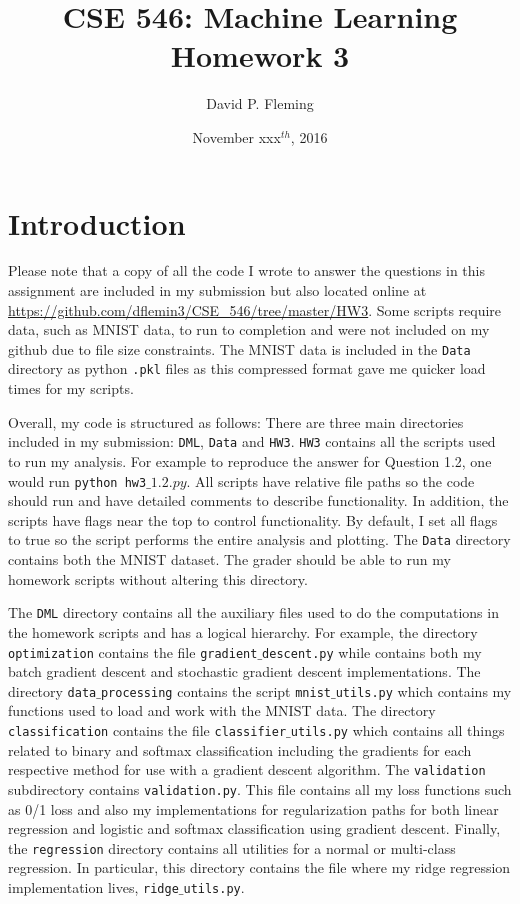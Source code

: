 \documentclass[12pt]{amsart}
\title{CSE 546: Machine Learning Homework 3}
\author{David P. Fleming}
\date{November xxx$^{th}$, 2016}
\begin{document}
\maketitle
\tableofcontents

\section*{Introduction}

Please note that a copy of all the code I wrote to answer the questions in this assignment are included in my submission but also located online at \url{https://github.com/dflemin3/CSE_546/tree/master/HW3}.  Some scripts require data, such as MNIST data, to run to completion and were not included on my github due to file size constraints.  The MNIST data is included in the {\tt Data} directory as python {\tt .pkl} files as this compressed format gave me quicker load times for my scripts.

Overall, my code is structured as follows:  There are three main directories included in my submission: {\tt DML}, {\tt Data} and {\tt HW3}. {\tt HW3} contains all the scripts used to run my analysis.  For example to reproduce the answer for Question 1.2, one would run {\tt python hw3$\_1.2.py$}.  All scripts have relative file paths so the code should run and have detailed comments to describe functionality.  In addition, the scripts have flags near the top to control functionality.  By default, I set all flags to true so the script performs the entire analysis and plotting.  The {\tt Data} directory contains both the MNIST dataset. The grader should be able to run my homework scripts without altering this directory.  

The {\tt DML} directory contains all the auxiliary files used to do the computations in the homework scripts and has a logical hierarchy.  For example, the directory {\tt optimization} contains the file {\tt gradient$\_$descent.py} while contains both my batch gradient descent and stochastic gradient descent implementations.  The directory {\tt data$\_$processing} contains the script {\tt mnist$\_$utils.py} which contains my functions used to load and work with the MNIST data.  The directory {\tt classification} contains the file {\tt classifier$\_$utils.py} which contains all things related to binary and softmax classification including the gradients for each respective method for use with a gradient descent algorithm.  The {\tt validation} subdirectory contains {\tt validation.py}.  This file contains all my loss functions such as 0/1 loss and also my implementations for regularization paths for both linear regression and logistic and softmax classification using gradient descent.  Finally, the {\tt regression} directory contains all utilities for a normal or multi-class regression.  In particular, this directory contains the file where my ridge regression implementation lives, {\tt ridge$\_$utils.py}. 
\end{document}
